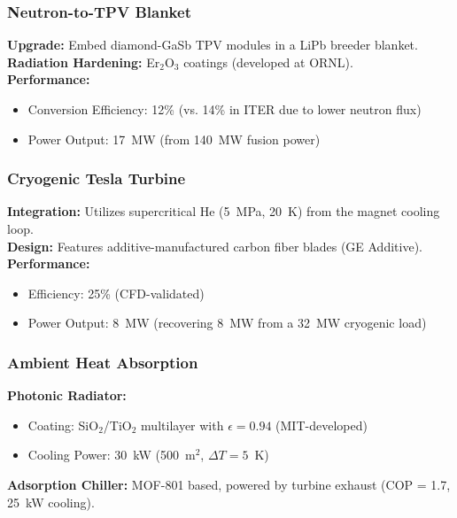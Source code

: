 \documentclass[12pt]{article}
\begin{document}
\subsubsection{Neutron-to-TPV Blanket}
\textbf{Upgrade:} Embed diamond-GaSb TPV modules in a LiPb breeder blanket.\\
\textbf{Radiation Hardening:} Er$_2$O$_3$ coatings (developed at ORNL).\\
\textbf{Performance:}
\begin{itemize}
    \item Conversion Efficiency: 12\% (vs. 14\% in ITER due to lower neutron flux)
    \item Power Output: 17~MW (from 140~MW fusion power)
\end{itemize}

\subsubsection{Cryogenic Tesla Turbine}
\textbf{Integration:} Utilizes supercritical He (5~MPa, 20~K) from the magnet cooling loop.\\
\textbf{Design:} Features additive-manufactured carbon fiber blades (GE Additive).\\
\textbf{Performance:}
\begin{itemize}
    \item Efficiency: 25\% (CFD-validated)
    \item Power Output: 8~MW (recovering 8~MW from a 32~MW cryogenic load)
\end{itemize}

\subsubsection{Ambient Heat Absorption}
\textbf{Photonic Radiator:}
\begin{itemize}
    \item Coating: SiO$_2$/TiO$_2$ multilayer with $\epsilon = 0.94$ (MIT-developed)
    \item Cooling Power: 30~kW (500~m$^2$, $\Delta T = 5$~K)
\end{itemize}
\textbf{Adsorption Chiller:} MOF-801 based, powered by turbine exhaust (COP = 1.7, 25~kW cooling).
\end{document}
